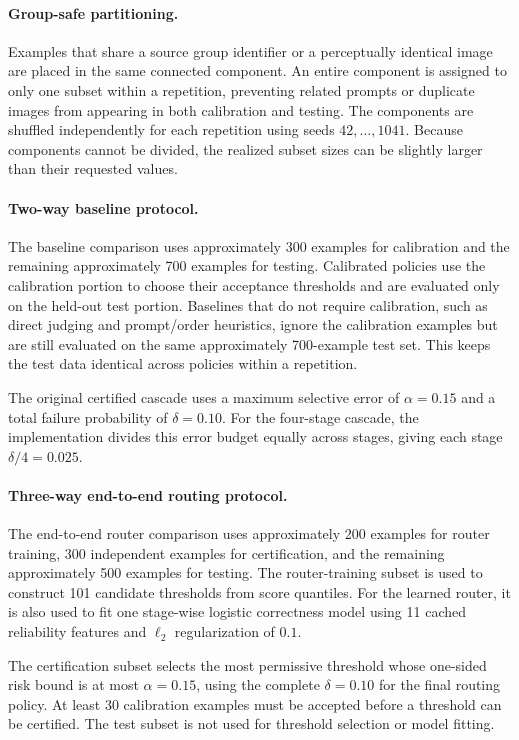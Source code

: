 \documentclass[11pt]{article}
\begin{document}
\paragraph{Group-safe partitioning.}
Examples that share a source group identifier or a perceptually identical
image are placed in the same connected component. An entire component is
assigned to only one subset within a repetition, preventing related prompts or
duplicate images from appearing in both calibration and testing. The
components are shuffled independently for each repetition using seeds
$42,\ldots,1041$. Because components cannot be divided, the realized subset
sizes can be slightly larger than their requested values.

\paragraph{Two-way baseline protocol.}
The baseline comparison uses approximately 300 examples for calibration and
the remaining approximately 700 examples for testing. Calibrated policies use
the calibration portion to choose their acceptance thresholds and are
evaluated only on the held-out test portion. Baselines that do not require
calibration, such as direct judging and prompt/order heuristics, ignore the
calibration examples but are still evaluated on the same approximately
700-example test set. This keeps the test data identical across policies within
a repetition.

The original certified cascade uses a maximum selective error of
$\alpha=0.15$ and a total failure probability of $\delta=0.10$. For the
four-stage cascade, the implementation divides this error budget equally
across stages, giving each stage $\delta/4=0.025$.

\paragraph{Three-way end-to-end routing protocol.}
The end-to-end router comparison uses approximately 200 examples for router
training, 300 independent examples for certification, and the remaining
approximately 500 examples for testing. The router-training subset is used to
construct 101 candidate thresholds from score quantiles. For the learned
router, it is also used to fit one stage-wise logistic correctness model using
11 cached reliability features and $\ell_2$ regularization of $0.1$.

The certification subset selects the most permissive threshold whose
one-sided risk bound is at most $\alpha=0.15$, using the complete
$\delta=0.10$ for the final routing policy. At least 30 calibration examples
must be accepted before a threshold can be certified. The test subset is not
used for threshold selection or model fitting.
\end{document}
